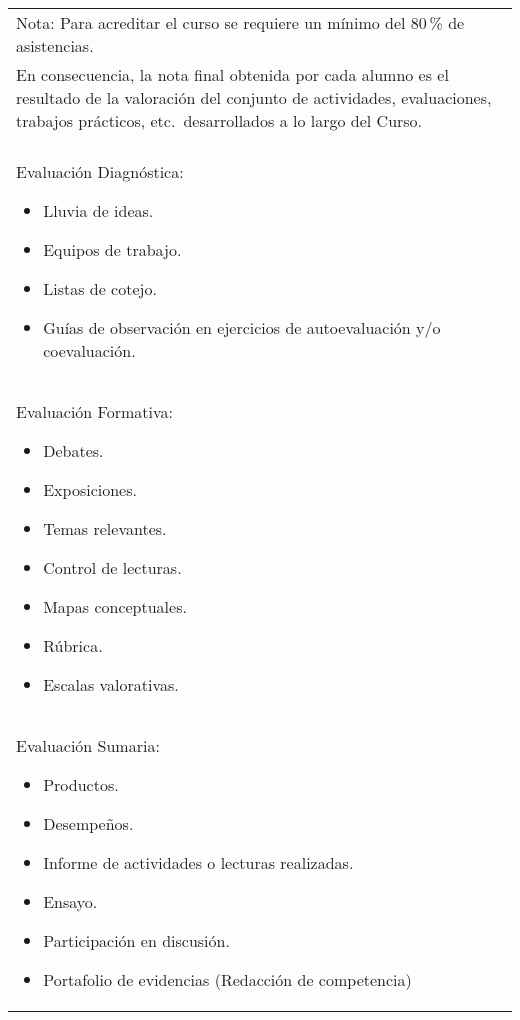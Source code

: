 \begin{tiny}
\begin{center}
\begin{supertabular}{|p{0.85\textwidth}|}
Nota: Para acreditar el curso se requiere un mínimo del 80\,\% de 
asistencias.\\ En consecuencia, la nota final obtenida por cada 
alumno es el resultado de la valoración del conjunto de actividades, 
evaluaciones, trabajos prácticos, etc.\ desarrollados a lo largo del 
Curso. \\\hline {}\\\hline Evaluación Diagnóstica:

\begin{itemize}
\item Lluvia de ideas. 
\item Equipos de trabajo. 
\item Listas de cotejo.
\item Guías de observación en ejercicios de autoevaluación y/o coevaluación.
\end{itemize}
\\\hline
Evaluación Formativa:

\begin{itemize}
\item Debates.
\item Exposiciones. 
\item Temas relevantes.
\item Control de lecturas.
\item Mapas conceptuales.
\item Rúbrica.
\item Escalas valorativas.
\end{itemize}
\\\hline
Evaluación Sumaria:

\begin{itemize}
\item Productos.
\item Desempeños.
\item Informe de actividades o lecturas realizadas.
\item Ensayo.
\item Participación en discusión.
\item Portafolio de evidencias (Redacción de competencia)
\end{itemize}
\\\hline
\end{supertabular}
\end{center}


\begin{center}
\setlength{\extrarowheight}{2.5pt}
\begin{supertabular}{|p{0.85\textwidth}|}
\hline
{}\centering{}\\\hline


\end{supertabular}
\end{center}
\end{tiny}
